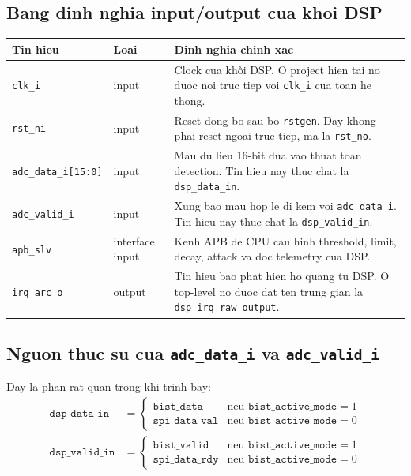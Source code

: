 \documentclass[12pt,a4paper]{article}
\begin{document}
\subsection{Bang dinh nghia input/output cua khoi DSP}
\begin{longtable}{>{\ttfamily}p{3cm} p{1.5cm} p{9.5cm}}
\toprule
\textnormal{Tin hieu} & \textnormal{Loai} & \textnormal{Dinh nghia chinh xac} \\
\midrule
\endhead
\texttt{clk\_i} & input & Clock cua khối DSP. O project hien tai no duoc noi truc tiep voi \texttt{clk\_i} cua toan he thong. \\
\texttt{rst\_ni} & input & Reset dong bo sau bo \texttt{rstgen}. Day khong phai reset ngoai truc tiep, ma la \texttt{rst\_no}. \\
\texttt{adc\_data\_i[15:0]} & input & Mau du lieu 16-bit dua vao thuat toan detection. Tin hieu nay thuc chat la \texttt{dsp\_data\_in}. \\
\texttt{adc\_valid\_i} & input & Xung bao mau hop le di kem voi \texttt{adc\_data\_i}. Tin hieu nay thuc chat la \texttt{dsp\_valid\_in}. \\
\texttt{apb\_slv} & interface input & Kenh APB de CPU cau hinh threshold, limit, decay, attack va doc telemetry cua DSP. \\
\texttt{irq\_arc\_o} & output & Tin hieu bao phat hien ho quang tu DSP. O top-level no duoc dat ten trung gian la \texttt{dsp\_irq\_raw\_output}. \\
\bottomrule
\end{longtable}

\subsection{Nguon thuc su cua \texttt{adc\_data\_i} va \texttt{adc\_valid\_i}}
Day la phan rat quan trong khi trinh bay:
\begin{align*}
\texttt{dsp\_data\_in} &= \begin{cases}
\texttt{bist\_data} & \text{neu } \texttt{bist\_active\_mode}=1 \\
\texttt{spi\_data\_val} & \text{neu } \texttt{bist\_active\_mode}=0
\end{cases} \\
\texttt{dsp\_valid\_in} &= \begin{cases}
\texttt{bist\_valid} & \text{neu } \texttt{bist\_active\_mode}=1 \\
\texttt{spi\_data\_rdy} & \text{neu } \texttt{bist\_active\_mode}=0
\end{cases}
\end{align*}
\end{document}
